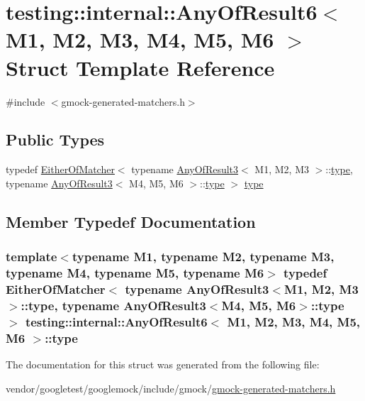\hypertarget{structtesting_1_1internal_1_1AnyOfResult6}{}\section{testing\+:\+:internal\+:\+:Any\+Of\+Result6$<$ M1, M2, M3, M4, M5, M6 $>$ Struct Template Reference}
\label{structtesting_1_1internal_1_1AnyOfResult6}


{\ttfamily \#include $<$gmock-\/generated-\/matchers.\+h$>$}

\subsection*{Public Types}
\begin{DoxyCompactItemize}
\item 
typedef \hyperlink{classtesting_1_1internal_1_1EitherOfMatcher}{Either\+Of\+Matcher}$<$ typename \hyperlink{structtesting_1_1internal_1_1AnyOfResult3}{Any\+Of\+Result3}$<$ M1, M2, M3 $>$\+::\hyperlink{structtesting_1_1internal_1_1AnyOfResult6_a15837eb05d9ac5a76c20d344a4988dd1}{type}, typename \hyperlink{structtesting_1_1internal_1_1AnyOfResult3}{Any\+Of\+Result3}$<$ M4, M5, M6 $>$\+::\hyperlink{structtesting_1_1internal_1_1AnyOfResult6_a15837eb05d9ac5a76c20d344a4988dd1}{type} $>$ \hyperlink{structtesting_1_1internal_1_1AnyOfResult6_a15837eb05d9ac5a76c20d344a4988dd1}{type}
\end{DoxyCompactItemize}


\subsection{Member Typedef Documentation}
\subsubsection[{\texorpdfstring{type}{type}}]{\setlength{\rightskip}{0pt plus 5cm}template$<$typename M1, typename M2, typename M3, typename M4, typename M5, typename M6$>$ typedef {\bf Either\+Of\+Matcher}$<$ typename {\bf Any\+Of\+Result3}$<$M1, M2, M3$>$\+::{\bf type}, typename {\bf Any\+Of\+Result3}$<$M4, M5, M6$>$\+::{\bf type} $>$ {\bf testing\+::internal\+::\+Any\+Of\+Result6}$<$ M1, M2, M3, M4, M5, M6 $>$\+::{\bf type}}\hypertarget{structtesting_1_1internal_1_1AnyOfResult6_a15837eb05d9ac5a76c20d344a4988dd1}{}\label{structtesting_1_1internal_1_1AnyOfResult6_a15837eb05d9ac5a76c20d344a4988dd1}


The documentation for this struct was generated from the following file\+:\begin{DoxyCompactItemize}
\item 
vendor/googletest/googlemock/include/gmock/\hyperlink{gmock-generated-matchers_8h}{gmock-\/generated-\/matchers.\+h}\end{DoxyCompactItemize}
